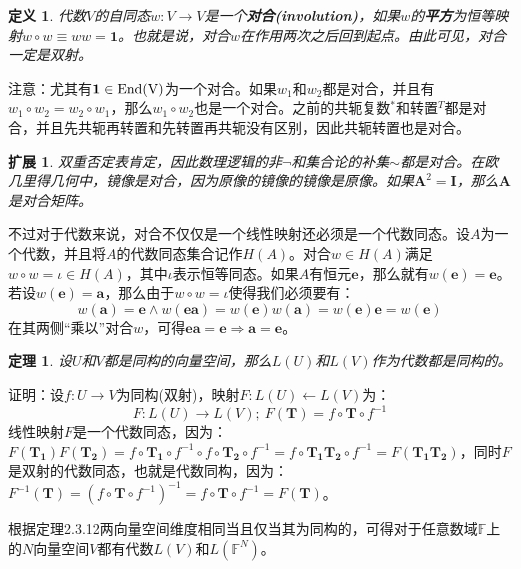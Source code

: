 \documentclass[mathserif,hyperref,UTF8,openany,b5paper]{ctexbook}
\newtheorem{defn}{定义}[section]
\newtheorem{thm}{定理}[section]
\newtheorem{kuo}{扩展}[section]
\begin{document}
\begin{defn}
    代数$V$的自同态$w:V\xrightarrow{} V$是一个\textbf{对合(involution)}，如果$w$的\textbf{平方}为恒等映射$w\circ w\equiv ww = \mathbf{1}$。也就是说，对合$w$在作用两次之后回到起点。由此可见，对合一定是双射。
\end{defn}
注意：尤其有$\mathbf{1}\in\rm{End}(V)$为一个对合。如果$w_1$和$w_2$都是对合，并且有$w_1\circ w_2=w_2\circ w_1$，那么$w_1\circ w_2$也是一个对合。之前的共轭复数$^{*}$和转置$^{T}$都是对合，并且先共轭再转置和先转置再共轭没有区别，因此共轭转置也是对合。
\begin{kuo}
    双重否定表肯定，因此数理逻辑的非$\neg$和集合论的补集$\sim$都是对合。在欧几里得几何中，镜像是对合，因为原像的镜像的镜像是原像。如果$\mathbf{A}^2=\mathbf{I}$，那么$\mathbf{A}$是对合矩阵。
\end{kuo}
不过对于代数来说，对合不仅仅是一个线性映射还必须是一个代数同态。设$A$为一个代数，并且将$A$的代数同态集合记作$H(A)$。对合$w\in H(A)$满足$w\circ w=\iota\in H(A)$，其中$\iota$表示恒等同态。如果$A$有恒元$\mathbf{e}$，那么就有$w(\mathbf{e})=\mathbf{e}$。若设$w(\mathbf{e})=\mathbf{a}$，那么由于$w\circ w =\iota$使得我们必须要有：
\begin{equation}
    w(\mathbf{a})=\mathbf{e} \land w(\mathbf{ea})=w(\mathbf{e})w(\mathbf{a})=w(\mathbf{e})\mathbf{e}=w(\mathbf{e})
\end{equation}
在其两侧“乘以”对合$w$，可得$\mathbf{ea=e}\Rightarrow \mathbf{a=e}$。
\begin{thm}
    设$U$和$V$都是同构的向量空间，那么$L(U)$和$L(V)$作为代数都是同构的。
\end{thm}
证明：设$f:U\xrightarrow{}V$为同构(双射)，映射$F:L(U)\xleftarrow{}L(V)$为：
\begin{equation}
    F:L(U)\xrightarrow{}L(V);\ F(\mathbf{T})=f\circ\mathbf{T}\circ f^{-1}  
\end{equation}
线性映射$F$是一个代数同态，因为：$F(\mathbf{T_1})F(\mathbf{T_2})=f\circ\mathbf{T_1}\circ f^{-1} \circ f\circ\mathbf{T_2}\circ f^{-1}= f\circ\mathbf{T_1 T_2}\circ f^{-1}=F(\mathbf{T_1T_2})$，同时$F$是双射的代数同态，也就是代数同构，因为：$F^{-1}(\mathbf{T})=(f\circ\mathbf{T}\circ f^{-1})^{-1}=f\circ\mathbf{T}\circ f^{-1}=F(\mathbf{T})$。

根据定理2.3.12两向量空间维度相同当且仅当其为同构的，可得对于任意数域$\mathbb{F}$上的$N$向量空间$V$都有代数$L(V)$和$L(\mathbb{F}^N)$。
\end{document}
